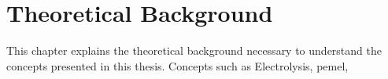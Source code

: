 \chapter{Theoretical Background}
\label{Chapter::Theoretical_Background} %

This chapter explains the theoretical background necessary to understand the concepts presented in this thesis.
Concepts such as Electrolysis, \ac{pemel},

